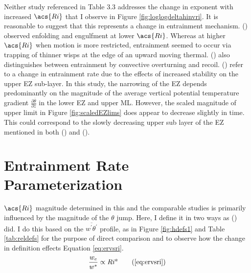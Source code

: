 Neither study referenced in Table 3.3 addresses the change in exponent with increased $\acs{Ri}$ that I observe in Figure \ref{fig:loglogdeltahinvri}.  It is reasonable to suggest that this represents a change in entrainment mechanism. \citeauthor{SullMoengStev} (\citeyear{SullMoengStev}) observed enfolding and engulfment at lower $\acs{Ri}$.  Whereas at higher $\acs{Ri}$ when motion is more restricted, entrainment seemed to occur via trapping of thinner wisps at the edge of an upward moving thermal.  \citeauthor{Turner86} (\citeyear{Turner86}) also distinguishes between entrainment by convective overturning and recoil. \citeauthor{GarciaMellado} (\citeyear{GarciaMellado}) refer to a change in entrainment rate due to the effects of increased stability on the upper \acs{EZ} sub-layer.  In this study, the narrowing of the \acs{EZ} depends predominantly on the magnitude of the average vertical potential temperature gradient $\frac{\partial \overline{\theta}}{\partial z}$ in the lower \acs{EZ} and upper \acs{ML}.  However, the scaled magnitude of upper limit in Figure \ref{fig:scaledEZlims} does appear to decrease slightly in time.  This could correspond to the slowly decreasing upper sub layer of the \acs{EZ} mentioned in both \citeauthor{GarciaMellado} (\citeyear{GarciaMellado}) and \citeauthor{FedConzMir04} (\citeyear{FedConzMir04}).\\

\section{Entrainment Rate Parameterization}
\label{sec:erparam}
$\acs{Ri}$ magnitude determined in this and the comparable studies is primarily influenced by the magnitude of the $\theta$ jump.  Here, I define it in two ways as \citeauthor{FedConzMir04} (\citeyear{FedConzMir04}) did.  I do this based on the $\overline{w^{'}\theta^{'}}$ profile, as in Figure \ref{fig:hdefs1} and Table \ref{tab:reldefs} for the purpose of direct comparison and to observe how the change in definition effects Equation \ref{eq:ervsri}.\\

\begin{equation}
\frac{w_{e}}{w^{*}} \propto Ri^{a} \tag{\ref{eq:ervsri}}
\end{equation}

